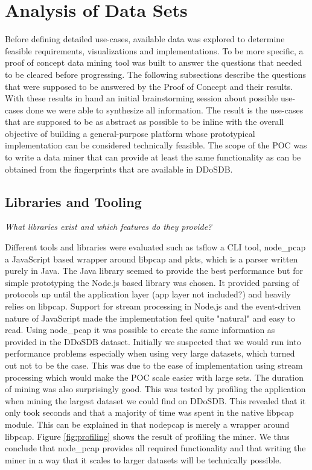 \section{Analysis of Data Sets}
Before defining detailed use-cases, available data was explored to determine feasible requirements, visualizations and implementations. To be more specific, a proof of concept data mining tool was built to answer the questions that needed to be cleared before progressing. The following subsections describe the questions that were supposed to be answered by the Proof of Concept and their results. With these results in hand an initial brainstorming session about possible use-cases done we were able to synthesize all information. The result is the use-cases that are supposed to be as abstract as possible to be inline with the overall objective of building a general-purpose platform whose prototypical implementation can be considered technically feasible.
The scope of the POC was to write a data miner that can provide at least the same functionality as can be obtained from the fingerprints that are available in DDoSDB.

\subsection{Libraries and Tooling}\label{librariesandtooling}

\textit{What libraries exist and which features do they provide?}   

   Different tools and libraries were evaluated such as tsflow a CLI tool, node\_pcap a JavaScript based wrapper around libpcap and pkts, which is a parser written purely in Java.
    The Java library seemed to provide the best performance but for simple prototyping the Node.js based library was chosen. It provided parsing of protocols up until the application layer (app layer not included?) and heavily relies on libpcap. Support for stream processing in Node.js and the event-driven nature of JavaScript made the implementation feel quite "natural" and easy to read.
    Using node\_pcap it was possible to create the same information as provided in the DDoSDB dataset. Initially we suspected that we would run into performance problems especially when using very large datasets, which turned out not to be the case. This was due to the ease of implementation using stream processing which would make the POC scale easier with large sets. The duration of mining was also surprisingly good. This was tested by profiling the application when mining the largest dataset we could find on DDoSDB. This revealed that it only took seconds and that a majority of time was spent in the native libpcap module. This can be explained in that node\-pcap is merely a wrapper around libpcap. Figure \ref{fig:profiling} shows the result of profiling the miner. We thus conclude that node\_pcap provides all required functionality and that writing the miner in a way that it scales to larger datasets will be technically possible.
    
